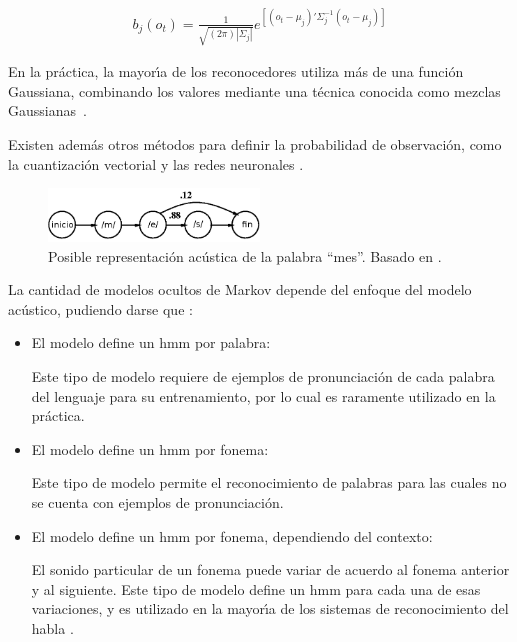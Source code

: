 \begin{enumerate}[A)]
	\begin{align}
    	b_j(o_t) = \frac{1}{\sqrt{(2\pi)|\Sigma_j|}}e^{[(o_t-\mu_j)'\Sigma_j^{-1}(o_t-\mu_j)]}\label{eq:hmmGaussian}
	\end{align}

	En la pr\'actica, la mayor{\'\i}a de los reconocedores utiliza m\'as de una funci\'on Gaussiana,
	combinando los valores mediante una t\'ecnica conocida como mezclas 
	\mbox{Gaussianas \cite{huang-handbook10}.}

	Existen adem\'as otros m\'etodos para definir la probabilidad de observaci\'on, como la cuantizaci\'on
	vectorial \cite{Burton1983} y las redes neuronales \cite{KristineApplying1995}.

\end{enumerate}

\begin{figure}[H] 
\centering
\includegraphics[width=0.5\textwidth]{./graphics/hmm_palabra.png}
\caption{Posible representaci\'on ac\'ustica de la palabra ``mes''. Basado en \cite{Jurafsky}.}
\label{figure:hmm-palabra}
\end{figure}

La cantidad de modelos ocultos de Markov depende del enfoque del modelo ac\'ustico, pudiendo darse 
que \cite{Livescu2012}:

\begin{itemize}
 	\item El modelo define un \gls{hmm} por palabra:


 		Este tipo de modelo requiere de ejemplos de pronunciaci\'on de cada palabra del lenguaje para 
 		su entrenamiento, por lo cual es raramente utilizado en la pr\'actica.
 	\item El modelo define un \gls{hmm} por fonema:


 		Este tipo de modelo permite el reconocimiento
 		de palabras para las cuales no se cuenta con ejemplos de pronunciaci\'on.
 	\item El modelo define un \gls{hmm} por fonema, dependiendo del contexto:


 		El sonido particular de un fonema puede variar de acuerdo al fonema anterior y al siguiente.
 		Este tipo de modelo define un \gls{hmm} para cada una de esas variaciones, y es utilizado
 		en la mayor{\'\i}a de los sistemas de reconocimiento del habla \cite{Odell95theuse}.
 \end{itemize}  

